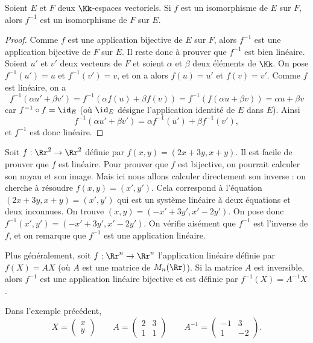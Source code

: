 \documentclass[class=report,crop=false]{standalone}
\begin{document}
\begin{proposition}
Soient $E$ et $F$ deux $\Kk$-espaces vectoriels.
Si $f$ est un isomorphisme de $E$ sur $F$, alors
$f^{-1}$ est un isomorphisme de $F$ sur $E$.
\end{proposition}

\begin{proof}
Comme $f$ est une application bijective de $E$ sur $F$,
alors $f^{-1}$ est une application bijective de
$F$ sur $E$. Il reste donc à prouver que $f^{-1}$ est bien linéaire.
Soient $u'$ et $v'$ deux vecteurs de $F$ et soient $\alpha$ et $\beta$ deux éléments de $\Kk$.
On pose
 $f^{-1}(u')=u $ et $f^{-1}(v')=v$, et  on a alors  $f(u)=u'$ et $f(v)=v'$.
 Comme $f$   est linéaire, on a
 $$f^{-1}(\alpha u' + \beta v')=f^{-1}\left ( \alpha f(u)+ \beta f(v) \right )=
 f^{-1}\left ( f(\alpha u + \beta v) \right ) =\alpha u+ \beta v$$
  car $f^{-1}\circ f= \id_{E}$
(où $\id_{E}$  désigne l'application identité de $E$ dans $E$).
Ainsi $$f^{-1}(\alpha u' + \beta v')=\alpha f^{-1}(u')+ \beta f^{-1}(v'),$$
et $f^{-1}$  est donc linéaire.
\end{proof}


\begin{exemple}
Soit $f : \Rr^2 \to \Rr^2$ définie par $f(x,y)=(2x+3y,x+y)$.
Il est facile de prouver que $f$ est linéaire.
Pour prouver que $f$ est bijective, on pourrait calculer son noyau et son image.
Mais ici nous allons calculer directement son inverse : on cherche
à résoudre $f(x,y)=(x',y')$. Cela correspond à l'équation
$(2x+3y,x+y) = (x',y')$ qui est un système linéaire à deux équations et deux inconnues.
On trouve $(x,y) = (-x'+3y',x'-2y')$. On pose donc $f^{-1}(x',y')= (-x'+3y',x'-2y')$.
On vérifie aisément que $f^{-1}$ est l'inverse de $f$, et on
remarque que $f^{-1}$ est une application linéaire.
\end{exemple}

\begin{exemple}
Plus généralement, soit  $f : \Rr^n \to \Rr^n$ l'application linéaire
définie par $f(X)=AX$ (où $A$ est une matrice de $M_n(\Rr)$).
Si la matrice $A$ est inversible, alors $f^{-1}$ est une application linéaire bijective et est
définie par $f^{-1}(X)= A^{-1} X$.

Dans l'exemple précédent,
$$X = \begin{pmatrix} x \\ y \end{pmatrix} \qquad
A = \begin{pmatrix} 2 & 3 \\ 1 & 1 \end{pmatrix} \qquad
A^{-1} = \begin{pmatrix} -1 & 3 \\ 1 & -2 \end{pmatrix}.$$
\end{exemple}
\end{document}
